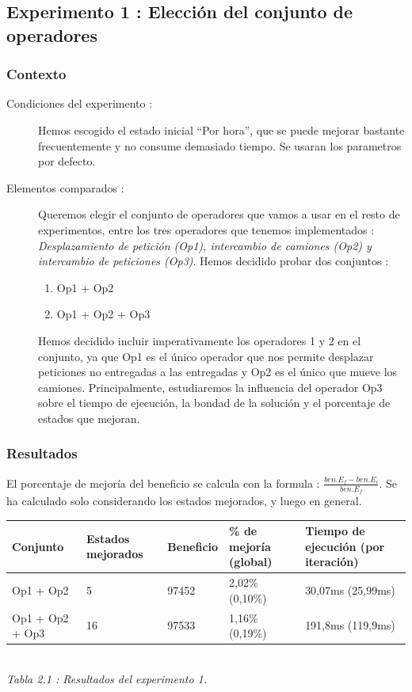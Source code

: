 \documentclass{article}
\begin{document}
\subsection{Experimento 1 : Elección del conjunto de operadores}

\subsubsection{Contexto}

\begin{description}
\item[Condiciones del experimento :] Hemos escogido el estado inicial ``Por
hora'', que se puede mejorar bastante frecuentemente y no consume demasiado
tiempo. Se usaran los parametros por defecto.
\item[Elementos comparados :] Queremos elegir el conjunto de operadores que
vamos a usar en el resto de experimentos, entre los tres operadores que tenemos
implementados : \emph{Desplazamiento de petición (Op1), intercambio de camiones
(Op2) y intercambio de peticiones (Op3)}. Hemos decidido probar dos conjuntos :
\begin{enumerate}
\item Op1 + Op2
\item Op1 + Op2 + Op3
\end{enumerate}
Hemos decidido incluir imperativamente los operadores 1 y 2 en el conjunto, ya
que Op1 es el único operador que nos permite desplazar peticiones no entregadas
a las entregadas y Op2 es el único que mueve los camiones. Principalmente,
estudiaremos la influencia del operador Op3 sobre el tiempo de ejecución, la
bondad de la solución y el porcentaje de estados que mejoran.
\end{description}

\subsubsection{Resultados}

El porcentaje de mejoría del beneficio se calcula con la formula :
$\frac{ben. E_f - ben. E_i}{ben. E_f}$. Se ha calculado solo considerando los
estados mejorados, y luego en general.

\begin{center}
\begin{tabular}{|l|l|l|l|l|}
\hline
Conjunto & Estados mejorados & Beneficio &  \% de mejoría (global) & Tiempo de
ejecución (por iteración)\\
\hline
Op1 + Op2 & 5 & 97452 & 2,02\% (0,10\%) & 30,07ms (25,99ms)\\
\hline
Op1 + Op2 + Op3 & 16 & 97533 & 1,16\% (0,19\%) & 191,8ms (119,9ms)\\
\hline
\end{tabular}\\
{\it Tabla 2.1 : Resultados del experimento 1.}
\end{center}
\end{document}
